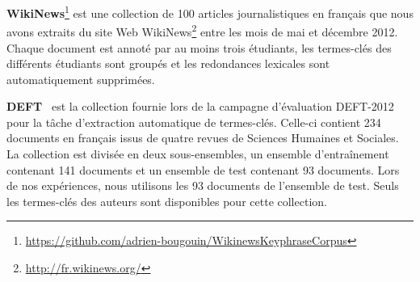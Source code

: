       \textbf{WikiNews}\footnote{\url{https://github.com/adrien-bougouin/WikinewsKeyphraseCorpus}}
      est une collection de 100 articles journalistiques en français que nous
      avons extraits du site Web
      WikiNews\footnote{\url{http://fr.wikinews.org/}} entre les mois de mai et
      décembre 2012. Chaque document est annoté par au moins trois étudiants,
      les termes-clés des différents étudiants sont groupés et les redondances
      lexicales sont automatiquement supprimées.

      \textbf{DEFT}~\cite{paroubek2012deft} est la collection fournie lors de la
      campagne d'évaluation DEFT-2012 pour la tâche d'extraction automatique de
      termes-clés. Celle-ci contient 234 documents en français issus de quatre
      revues de Sciences Humaines et Sociales. La collection est divisée en deux
      sous-ensembles, un ensemble d'entraînement contenant 141 documents et un
      ensemble de test contenant 93 documents. Lors de nos expériences, nous
      utilisons les 93 documents de l'ensemble de test. Seuls les termes-clés
      des auteurs sont disponibles pour cette collection.

